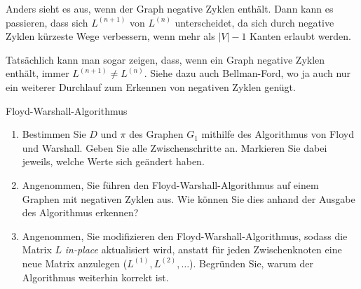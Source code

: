 \documentclass[11pt,a4paper]{article}
\begin{document}
\begin{loesung}
\begin{enumerate}
        Anders sieht es aus, wenn der Graph negative Zyklen enthält.
        Dann kann es passieren, dass sich $L^{(n + 1)}$ von $L^{(n)}$ unterscheidet, da sich durch negative Zyklen kürzeste Wege verbessern, wenn mehr als $|V| - 1$ Kanten erlaubt werden.

        Tatsächlich kann man sogar zeigen, dass, wenn ein Graph negative Zyklen enthält, immer $L^{(n + 1)} \neq L^{(n)}$.
        Siehe dazu auch Bellman-Ford, wo ja auch nur ein weiterer Durchlauf zum Erkennen von negativen Zyklen genügt.
    \end{enumerate}
\end{loesung}

\begin{aufgabe}{2}{Floyd-Warshall-Algorithmus}
    \begin{enumerate}
        \item Bestimmen Sie $D$ und $\pi$ des Graphen $G_1$ mithilfe des Algorithmus von Floyd und Warshall.
        Geben Sie alle Zwischenschritte an.
        Markieren Sie dabei jeweils, welche Werte sich geändert haben.
        \item Angenommen, Sie führen den Floyd-Warshall-Algorithmus auf einem Graphen mit negativen Zyklen aus.
        Wie können Sie dies anhand der Ausgabe des Algorithmus erkennen?
        \item Angenommen, Sie modifizieren den Floyd-Warshall-Algorithmus, sodass die Matrix $L$ \emph{in-place} aktualisiert wird, anstatt für jeden Zwischenknoten eine neue Matrix anzulegen ($L^{(1)}, L^{(2)}, \ldots$).
        Begründen Sie, warum der Algorithmus weiterhin korrekt ist.
    \end{enumerate}
\end{aufgabe}
\end{document}
